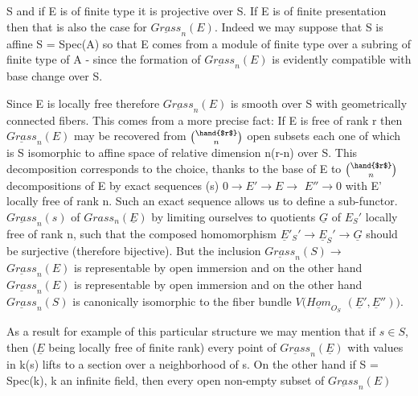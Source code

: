 
S and if E is of finite type it is projective over S.  If E is of
finite presentation then that is also the case for $\underline{Grass}_n(E)$.
Indeed we may suppose that S is affine S = Spec(A) so that E comes
from a module of finite type over a subring of finite type of A -
since the formation of $\underline{Grass}_n(E)$ is evidently compatible with base
change over S.

Since E is locally free therefore $\underline{Grass}_n(E)$ is smooth over S
with geometrically connected fibers.  This comes from a more
precise fact:  If E is free of rank r then $\underline{Grass}_n(E)$ may be
recovered from $\binom{\hand{$r$}}{n}$ open subsets each one of which is S isomorphic
to affine space of relative dimension n(r-n) over S.  This
decomposition corresponds to the choice, thanks to the base of E
to $\binom{\hand{$r$}}{n}$ decompositions of E by exact sequences (s) $0 \to E' \to E \to$
$E'' \to 0$ with E' locally free of rank n.  Such an exact sequence
allows us to define a sub-functor.  $\underline{Grass}_n(s)$ of $Grass_n(\underline{E})$ by
limiting ourselves to quotients $\underline{G}$ of $E_S{}'$ locally free of rank n,
such that the composed homomorphism $\underline{E}'_S{}' \to \underline{E}_S{}' \to \underline{G}$ should be
surjective (therefore bijective).  But the inclusion $\underline{Grass}_n(S) \to$
$\underline{Grass}_n(E)$ is representable by open immersion and on the other hand
$\underline{Grass}_n(E)$ is representable by open immersion and on the other hand
$\underline{Grass}_n(S)$ is canonically isomorphic to the fiber bundle $V(\underline{Hom}_{O_S}$
$(\underline{E}', \underline{E}''))$.

As a result for example of this particular structure we may
mention that if $s \in S$, then ($\underline{E}$ being locally free of finite rank)
every point of $\underline{Grass}_n(\underline{E})$ with values in k(s) lifts to a section
over a neighborhood of s.  On the other hand if S = Spec(k), k an
infinite field, then every open non-empty subset of $\underline{Grass}_n(E)$
